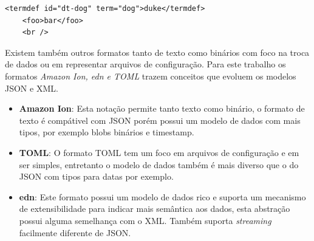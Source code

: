 \begin{lstlisting}[caption=Exemplo de elementos XML,label={lst:xmlelement}]
    <termdef id="dt-dog" term="dog">duke</termdef>
    <foo>bar</foo>
    <br />
\end{lstlisting}

Existem também outros formatos tanto de texto como binários com foco na troca de dados
ou em representar arquivos de configuração. Para este trabalho os formatos \textit{Amazon Ion, edn e TOML}
trazem conceitos que evoluem os modelos JSON e XML.

\begin{itemize}
    \item \textbf{Amazon Ion}: Esta notação permite tanto texto como binário, o formato de texto
    é compátivel com JSON porém possui um modelo de dados com mais tipos, por exemplo blobs binários e
    timestamp.
    \item \textbf{TOML}: O formato TOML tem um foco em arquivos de configuração e em ser simples, 
    entretanto o modelo de dados também é mais diverso que o do JSON com tipos para datas por exemplo.
    \item \textbf{edn}: Este formato possui um modelo de dados rico e suporta um 
    mecanismo de extensibilidade para indicar mais semântica aos dados, esta abstração possui 
    alguma semelhança com o XML. Também suporta \textit{streaming} facilmente diferente de JSON.
\end{itemize}